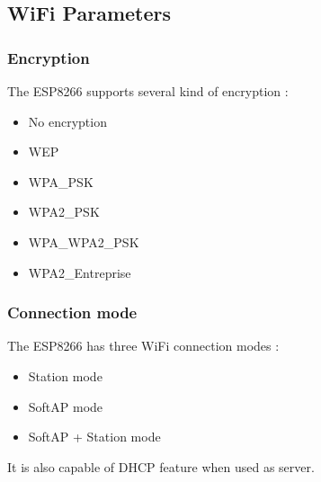 \documentclass[11pt]{article}
\begin{document}
\subsection{WiFi Parameters}
\subsubsection{Encryption}
The ESP8266 supports several kind of encryption :
\begin{itemize}
\item No encryption
\item WEP
\item WPA\_PSK
\item WPA2\_PSK
\item WPA\_WPA2\_PSK
\item WPA2\_Entreprise
\end{itemize}

\subsubsection{Connection mode}
The ESP8266 has three WiFi connection modes :
\begin{itemize}
    \item Station mode
    \item SoftAP mode
    \item SoftAP + Station mode
\end{itemize}
It is also capable of DHCP feature when used as server.
\end{document}

